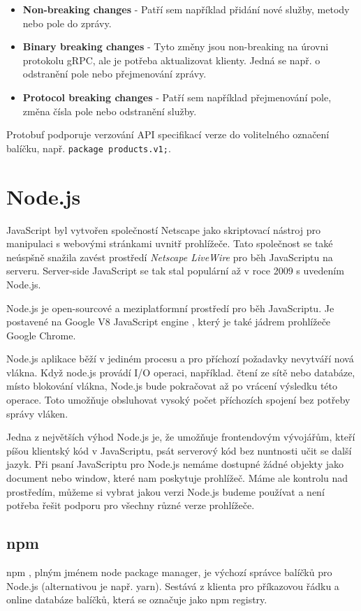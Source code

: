 \documentclass[thesis=M,czech]{FITthesis}[2019/12/23]
\begin{document}
\begin{itemize}
    \item \textbf{Non-breaking changes} - Patří sem například přidání nové služby, metody nebo pole do zprávy.
    \item \textbf{Binary breaking changes} - Tyto změny jsou non-breaking na úrovni protokolu gRPC, ale je potřeba aktualizovat klienty. Jedná se např. o odstranění pole nebo přejmenování zprávy.
    \item \textbf{Protocol breaking changes} - Patří sem například přejmenování pole, změna čísla pole nebo odstranění služby.
\end{itemize}

Protobuf podporuje verzování API specifikací verze do volitelného označení balíčku, např. \texttt{package products.v1;}. 

\section{Node.js }
JavaScript byl vytvořen společností Netscape jako skriptovací nástroj pro manipulaci s webovými stránkami uvnitř prohlížeče. Tato společnost se také neúspšně snažila zavést prostředí \textit{Netscape LiveWire} pro běh JavaScriptu na serveru. Server-side JavaScript se tak stal populární až v roce 2009 s uvedením Node.js.

Node.js \cite{node} je open-sourcové a meziplatformní prostředí pro běh JavaScriptu. Je postavené na Google V8 JavaScript engine \cite{v8}, který je také jádrem prohlížeče Google Chrome.

Node.js aplikace běží v jediném procesu a pro příchozí požadavky nevytváří nová vlákna. Když node.js provádí I/O operaci, například. čtení ze sítě nebo databáze, místo blokování vlákna, Node.js bude pokračovat až po vrácení výsledku této operace. Toto umožňuje obsluhovat vysoký počet příchozích spojení bez potřeby správy vláken.

Jedna z největších výhod Node.js je, že umožňuje frontendovým vývojářům, kteří píšou klientský kód v JavaScriptu, psát serverový kód bez nuntnosti učit se další jazyk. 
Při psaní JavaScriptu pro Node.js nemáme dostupné žádné objekty jako document nebo window, které nam poskytuje prohlížeč. Máme ale kontrolu nad prostředím, můžeme si vybrat jakou verzi Node.js budeme používat a není potřeba řešit podporu pro všechny různé verze prohlížeče.

\subsection{npm}
npm \cite{npm}, plným jménem node package manager, je výchozí správce balíčků pro Node.js (alternativou je např. yarn\cite{yarn}). Sestává z klienta pro příkazovou řádku a online databáze balíčků, která se označuje jako npm registry.
\end{document}
